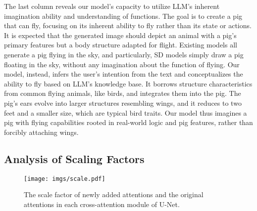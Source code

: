 
The last column reveals our model's capacity to utilize LLM's inherent imagination ability and understanding of functions. The goal is to create a pig that can fly, focusing on its inherent ability to fly rather than its state or actions. It is expected that the generated image should depict an animal with a pig's primary features but a body structure adapted for flight. 
Existing models all generate a pig flying in the sky, and particularly, SD models simply draw a pig floating in the sky, without any imagination about the function of flying. 
Our model, instead, infers the user's intention from the text and conceptualizes the ability to fly based on LLM's knowledge base. It borrows structure characteristics from common flying animals, like birds, and integrates them into the pig. The pig's ears evolve into larger structures resembling wings, and it reduces to two feet and a smaller size, which are typical bird traits. Our model thus imagines a pig with flying capabilities rooted in real-world logic and pig features, rather than forcibly attaching wings.

\subsection{Analysis of Scaling Factors}
\begin{figure}[t]
    \centering
    \texttt{[image: imgs/scale.pdf]}
    \vspace{-3ex}
    \caption{The scale factor of newly added attentions and the original attentions in each cross-attention module of U-Net.}

    \label{fig:scale}
\end{figure}

